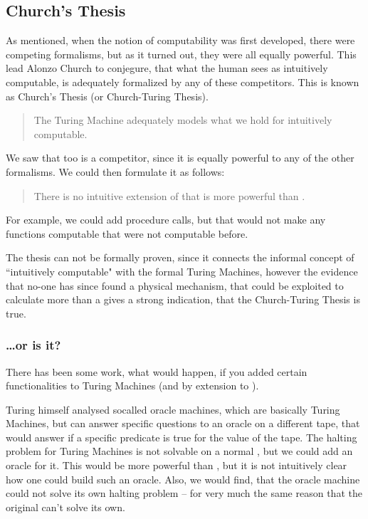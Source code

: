 \subsection{Church's Thesis}
As mentioned, when the notion of computability was first developed, there 
were competing formalisms, but as it turned out, they were all equally 
powerful. This lead Alonzo Church to conjegure, that what the human sees 
as intuitively computable, is adequately formalized by any of these 
competitors. This is known as Church's Thesis (or Church-Turing Thesis).

\begin{quote}
	The Turing Machine adequately models what we hold for intuitively computable.
\end{quote}

We saw that \WHILE too is a competitor, since it is equally powerful to any 
of the other formalisms. We could then formulate it as follows:

\begin{quote}
	There is no intuitive extension of \WHILE that is more powerful than \WHILE.
\end{quote}

For example, we could add procedure calls, but that would not make any 
functions computable that were not computable before.

The thesis can not be formally proven, since it connects the informal concept 
of ``intuitively computable" with the formal Turing Machines, however the 
evidence that no-one has since found a physical mechanism, that could be 
exploited to calculate more than a \TM gives a strong indication, that the 
Church-Turing Thesis is true.

\subsubsection{\dots or is it?}
There has been some work, what would happen, if you added certain 
functionalities to Turing Machines (and by extension to \WHILE). 

Turing himself analysed socalled oracle machines, which are basically Turing 
Machines, but can answer specific questions to an oracle on a different tape, 
that would answer if a specific predicate is true for the value of the tape.
The halting problem for Turing Machines is not solvable on a normal \TM, but 
we could add an oracle for it. This would be more powerful than \TM, but it 
is not intuitively clear how one could build such an oracle. Also, we would 
find, that the oracle machine could not solve its own halting problem -- for 
very much the same reason that the original \TM can't solve its own.

